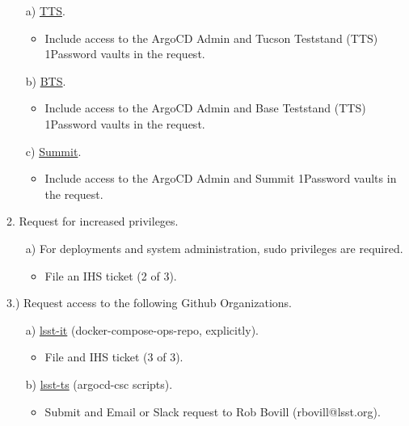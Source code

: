 \begin{itemize}
	\item[a)] \href{https://obs-controls.lsst.io/System-Testing-Deployments-and-Upgrades/Control-System-Upgrade/Deployment-Activities/tucson-teststand/index.html}{TTS}.
	\begin{itemize}
		\item Include access to the ArgoCD Admin and Tucson Teststand (TTS) 1Password vaults in the request.
	\end{itemize}
	\item[b)] \href{https://obs-controls.lsst.io/System-Testing-Deployments-and-Upgrades/Control-System-Upgrade/Deployment-Activities/base-teststand/index.html#deployment-activities-bts-resources}{BTS}.
	\begin{itemize}
		\item Include access to the ArgoCD Admin and Base Teststand (TTS) 1Password vaults in the request.
	\end{itemize}
	\item[c)] \href{https://obs-controls.lsst.io/System-Testing-Deployments-and-Upgrades/Control-System-Upgrade/Deployment-Activities/summit/index.html}{Summit}.
	\begin{itemize}
		\item Include access to the ArgoCD Admin and Summit 1Password vaults in the request.
	\end{itemize}
\end{itemize}

2. Request for increased privileges.

\begin{itemize}
	\item[a)] For deployments and system administration, sudo privileges are required.
	\begin{itemize}
		\item File an IHS ticket (2 of 3).
	\end{itemize}
\end{itemize}

3.) Request access to the following Github Organizations.

\begin{itemize}
	\item[a)] \href{https://github.com/lsst-it}{lsst-it} (docker-compose-ops-repo, explicitly).
	\begin{itemize}
		\item File and IHS ticket (3 of 3).
	\end{itemize}
	\item[b)] \href{https://github.com/lsst-ts}{lsst-ts} (argocd-csc scripts).
	\begin{itemize}
		\item Submit and Email or Slack request to Rob Bovill (rbovill@lsst.org).
	\end{itemize}
\end{itemize}

